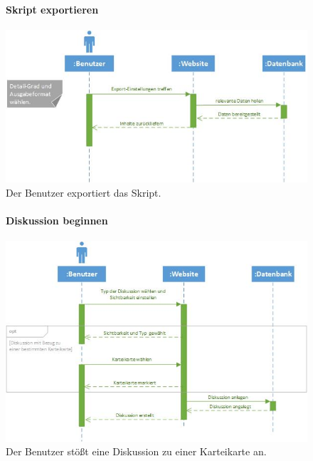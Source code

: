 \documentclass[12pt,a4paper]{article}
\begin{document}
\begin{figure}[H]
	\centering
	\paragraph{Skript exportieren}
	\includegraphics[width=\textwidth]{Bilder/Sequenzdiagramme/SkriptExportieren1.jpg}
	\caption{Der Benutzer exportiert das Skript.}
	\label{SzSkriptExportieren}
\end{figure}
\begin{figure}[H]
	\centering
	\paragraph{Diskussion beginnen}
	\includegraphics[width=\textwidth]{Bilder/Sequenzdiagramme/DiskussionAnstossen1.jpg}
	\caption{Der Benutzer stößt eine Diskussion zu einer Karteikarte an.}
	\label{SzDiskussionAnstossen}
\end{figure}
\end{document}
